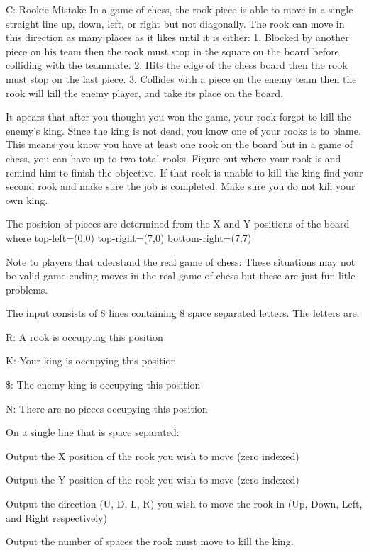 \begin{problem}{C: Rookie Mistake}
In a game of chess, the rook piece is able to move in a single straight line up, down, left, or right but not diagonally.
The rook can move in this direction as many places as it likes until it is either:
1. Blocked by another piece on his team then the rook must stop in the square on the board before colliding with the teammate.
2. Hits the edge of the chess board then the rook must stop on the last piece.
3. Collides with a piece on the enemy team then the rook will kill the enemy player, and take its place on the board.

It apears that after you thought you won the game, your rook forgot to kill the enemy's king.
Since the king is not dead, you know one of your rooks is to blame.
This means you know you have at least one rook on the board but in a game of chess, you can have up to two total rooks.
Figure out where your rook is and remind him to finish the objective.
If that rook is unable to kill the king find your second rook and make sure the job is completed.
Make sure you do not kill your own king.

The position of pieces are determined from the X and Y positions of the board where
top-left=(0,0)     top-right=(7,0)     bottom-right=(7,7)

Note to players that uderstand the real game of chess: These situations may not be valid game ending moves in the real game of chess but these are just fun litle problems.
\end{problem}

\begin{formalin}
The input consists of 8 lines containing 8 space separated letters.
The letters are:

R: A rook is occupying this position

K: Your king is occupying this position

\$: The enemy king is occupying this position

N: There are no pieces occupying this position
\end{formalin}

\begin{formalout}
On a single line that is space separated:

Output the X position of the rook you wish to move (zero indexed)

Output the Y position of the rook you wish to move (zero indexed)

Output the direction (U, D, L, R) you wish to move the rook in (Up, Down, Left, and Right respectively)

Output the number of spaces the rook must move to kill the king.
\end{formalout}

